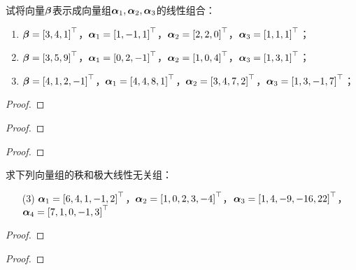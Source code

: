 \begin{problem}
试将向量\(\boldsymbol{\beta}\)表示成向量组\(\boldsymbol{\alpha}_1,\boldsymbol{\alpha}_2,\boldsymbol{\alpha}_3\)的线性组合：
\begin{enumerate}
    \item \(\boldsymbol{\beta}=\left[ 3,4,1 \right]^\top\)，\(\boldsymbol{\alpha}_1=\left[ 1,-1,1 \right]^\top\)，\(\boldsymbol{\alpha}_2=\left[ 2,2,0 \right]^\top\)，\(\boldsymbol{\alpha}_3=\left[ 1,1,1 \right]^\top\)；
    \item \(\boldsymbol{\beta}=\left[ 3,5,9 \right]^\top\)，\(\boldsymbol{\alpha}_1=\left[ 0,2,-1 \right]^\top\)，\(\boldsymbol{\alpha}_2=\left[ 1,0,4 \right]^\top\)，\(\boldsymbol{\alpha}_3=\left[ 1,3,1 \right]^\top\)；
    \item \(\boldsymbol{\beta}=\left[ 4,1,2,-1 \right]^\top\)，\(\boldsymbol{\alpha}_1=\left[ 4,4,8,1 \right]^\top\)，\(\boldsymbol{\alpha}_2=\left[ 3,4,7,2 \right]^\top\)，\(\boldsymbol{\alpha}_3=\left[ 1,3,-1,7 \right]^\top\)；
\end{enumerate}
\end{problem}
\begin{proof}

\end{proof}

\begin{problem}

\end{problem}
\begin{proof}

\end{proof}

\begin{problem}

\end{problem}
\begin{proof}

\end{proof}

\begin{problem}
求下列向量组的秩和极大线性无关组：
\begin{enumerate}
    \item[(3)] \(\boldsymbol{\alpha}_1=\left[ 6,4,1,-1,2 \right]^\top\)，\(\boldsymbol{\alpha}_2=\left[ 1,0,2,3,-4 \right]^\top\)，\(\boldsymbol{\alpha}_3=\left[ 1,4,-9,-16,22 \right]^\top\)，\(\boldsymbol{\alpha}_4=\left[ 7,1,0,-1,3 \right]^\top\)
\end{enumerate}
\end{problem}
\begin{proof}

\end{proof}

\begin{problem}

\end{problem}
\begin{proof}

\end{proof}

